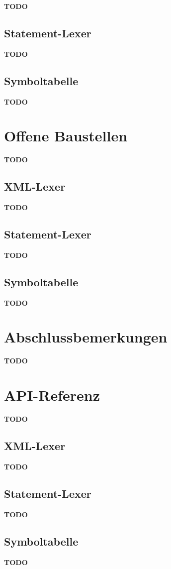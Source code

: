 \documentclass[10pt,a4paper,ngerman,titlepage,tocindentauto]{article}
\newcommand{\TODO}{{\LARGE\bf\color{crimson} TODO}}
\begin{document}
			\TODO
	
		\subsection{Statement-Lexer}
			\TODO
	
		\subsection{Symboltabelle}
			\TODO
	
	\section{Offene Baustellen}
		\TODO
	
		\subsection{XML-Lexer}
			\TODO
	
		\subsection{Statement-Lexer}
			\TODO
	
		\subsection{Symboltabelle}
			\TODO
	
	\section[Abschlussbemerkungen]{\hypertarget{Abschlussbemerkungen}{Abschlussbemerkungen}}
		\TODO
		
	\section{API-Referenz}
		\TODO
	
		\subsection[XML-Lexer]{\hypertarget{XML-Lexer-API}{XML-Lexer}}
			\TODO
	
		\subsection{Statement-Lexer}
			\TODO
	
		\subsection{Symboltabelle}
			\TODO
	
\end{document}
